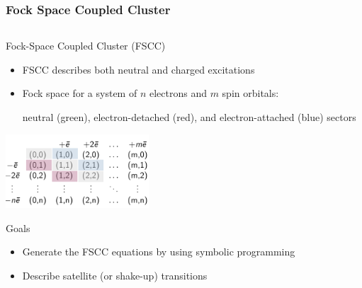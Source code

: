 \documentclass[aspectratio=169,9pt]{beamer}
\begin{document}
\begin{frame}
\frametitle{Fock Space Coupled Cluster}

        \begin{columns}
        \begin{column}{0.80\textwidth}

\begin{block}{Fock-Space Coupled Cluster (FSCC)}

\begin{itemize}
\item FSCC describes both neutral and charged excitations

\item Fock space for a system of $n$ electrons and $m$  spin orbitals:

neutral (green), electron-detached (red), and electron-attached (blue) sectors 

\end{itemize}

\vspace{-0.5cm}
\begin{center}
\includegraphics[width=0.4\textwidth]{fig/fscc.png}
\end{center}

\end{block}

\begin{block}{Goals}
\begin{itemize}
\item Generate the FSCC equations by using symbolic programming
\item Describe satellite (or shake-up) transitions
\end{itemize}
\end{block}
        \end{column}


\end{columns}
\end{frame}
\end{document}
